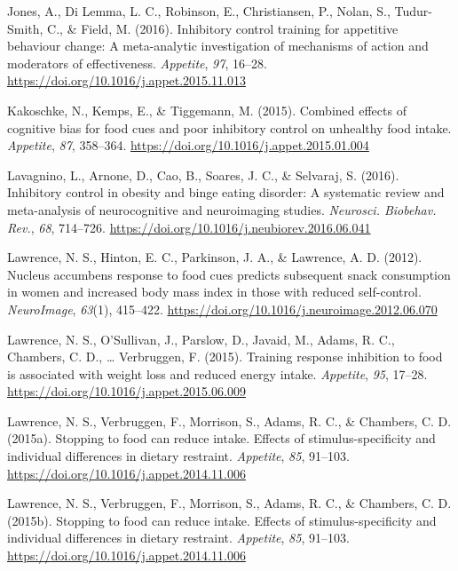 \documentclass[man,floatsintext]{apa6}
\begin{document}
\hypertarget{ref-jones_inhibitory_2016}{}
Jones, A., Di Lemma, L. C., Robinson, E., Christiansen, P., Nolan, S.,
Tudur-Smith, C., \& Field, M. (2016). Inhibitory control training for
appetitive behaviour change: A meta-analytic investigation of mechanisms
of action and moderators of effectiveness. \emph{Appetite}, \emph{97},
16--28. \url{https://doi.org/10.1016/j.appet.2015.11.013}

\hypertarget{ref-kakoschke_combined_2015-1}{}
Kakoschke, N., Kemps, E., \& Tiggemann, M. (2015). Combined effects of
cognitive bias for food cues and poor inhibitory control on unhealthy
food intake. \emph{Appetite}, \emph{87}, 358--364.
\url{https://doi.org/10.1016/j.appet.2015.01.004}

\hypertarget{ref-lavagnino_inhibitory_2016}{}
Lavagnino, L., Arnone, D., Cao, B., Soares, J. C., \& Selvaraj, S.
(2016). Inhibitory control in obesity and binge eating disorder: A
systematic review and meta-analysis of neurocognitive and neuroimaging
studies. \emph{Neurosci. Biobehav. Rev.}, \emph{68}, 714--726.
\url{https://doi.org/10.1016/j.neubiorev.2016.06.041}

\hypertarget{ref-lawrence_nucleus_2012-1}{}
Lawrence, N. S., Hinton, E. C., Parkinson, J. A., \& Lawrence, A. D.
(2012). Nucleus accumbens response to food cues predicts subsequent
snack consumption in women and increased body mass index in those with
reduced self-control. \emph{NeuroImage}, \emph{63}(1), 415--422.
\url{https://doi.org/10.1016/j.neuroimage.2012.06.070}

\hypertarget{ref-lawrence_training_2015}{}
Lawrence, N. S., O'Sullivan, J., Parslow, D., Javaid, M., Adams, R. C.,
Chambers, C. D., \ldots{} Verbruggen, F. (2015). Training response
inhibition to food is associated with weight loss and reduced energy
intake. \emph{Appetite}, \emph{95}, 17--28.
\url{https://doi.org/10.1016/j.appet.2015.06.009}

\hypertarget{ref-lawrence_stopping_2015-3}{}
Lawrence, N. S., Verbruggen, F., Morrison, S., Adams, R. C., \&
Chambers, C. D. (2015a). Stopping to food can reduce intake. Effects of
stimulus-specificity and individual differences in dietary restraint.
\emph{Appetite}, \emph{85}, 91--103.
\url{https://doi.org/10.1016/j.appet.2014.11.006}

\hypertarget{ref-lawrence_stopping_2015}{}
Lawrence, N. S., Verbruggen, F., Morrison, S., Adams, R. C., \&
Chambers, C. D. (2015b). Stopping to food can reduce intake. Effects of
stimulus-specificity and individual differences in dietary restraint.
\emph{Appetite}, \emph{85}, 91--103.
\url{https://doi.org/10.1016/j.appet.2014.11.006}
\end{document}
